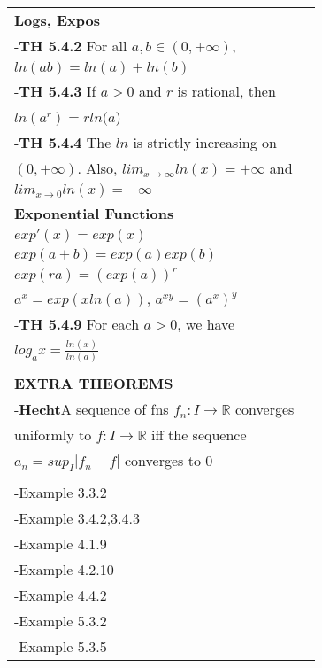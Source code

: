 \documentclass[10 pt,landscape]{article}
\begin{document}
\begin{multicols}{4}
\begin{tabular}{@{}ll@{}}
\end{tabular}

\begin{tabular}{@{}ll@{}}
\textbf{Logs, Expos}\\
-\textbf{TH 5.4.2} For all $a,b \in (0, +\infty)$,\\ $ln(ab)=ln(a) +ln(b)$\\
-\textbf{TH 5.4.3} If $a>0$ and $r$ is rational, then\\ $ln(a^r)=rln(a$)\\
-\textbf{TH 5.4.4} The $ln$ is strictly increasing on\\ $(0, +\infty)$. Also, $lim_{x \to \infty}ln(x)=+\infty$ and\\ $lim_{x \to 0}ln(x)=-\infty$\\
\textbf{Exponential Functions} \\$exp'(x)=exp(x)$\\$exp(a+b)=exp(a)exp(b)$\\$exp(ra)=(exp(a))^r$\\
$a^x=exp(xln(a))$, $a^{xy}=(a^x)^y$\\
-\textbf{TH 5.4.9} For each $a>0$, we have \\ $log_ax=\frac{ln(x)}{ln(a)}$
\\
\\
\textbf{EXTRA THEOREMS}\\
-\textbf{Hecht}A sequence of fns $f_n:I \to \mathbb{R}$ converges\\ uniformly to $f:I \to \mathbb{R}$ iff the sequence\\ $a_n=sup_I|f_n-f|$ converges to $0$\\
\\-Example 3.3.2\\
-Example 3.4.2,3.4.3\\
-Example 4.1.9\\
-Example 4.2.10\\
-Example 4.4.2\\
-Example 5.3.2\\
-Example 5.3.5\\

\end{tabular} 







\end{multicols}
\end{document}
